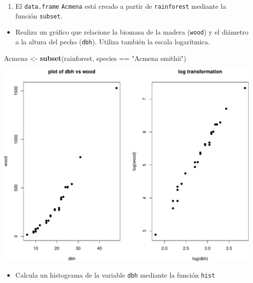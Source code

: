 \documentclass[]{article}
\def\tightlist{}
\newenvironment{Shaded}{\begin{snugshade}}{\end{snugshade}}
\newcommand{\KeywordTok}[1]{\textcolor[rgb]{0.13,0.29,0.53}{\textbf{{#1}}}}
\newcommand{\StringTok}[1]{\textcolor[rgb]{0.31,0.60,0.02}{{#1}}}
\newcommand{\NormalTok}[1]{{#1}}
\numberwithin{equation}{section}
\begin{document}
\begin{enumerate}
\def\labelenumi{\arabic{enumi}.}
\setcounter{enumi}{2}
\tightlist
\item
  El \texttt{data.frame} \texttt{Acmena} está creado a partir de
  \texttt{rainforest} mediante la función \texttt{subset}.
\end{enumerate}

\begin{itemize}
\tightlist
\item
  Realiza un gráfico que relacione la biomasa de la madera
  (\texttt{wood}) y el diámetro a la altura del pecho (\texttt{dbh}).
  Utiliza también la escala logarítmica.
\end{itemize}

\begin{Shaded}
\begin{Highlighting}[]
\NormalTok{Acmena <-}\StringTok{ }\KeywordTok{subset}\NormalTok{(rainforest, species ==}\StringTok{ "Acmena smithii"}\NormalTok{)}
\end{Highlighting}
\end{Shaded}

\includegraphics{tema1_files/figure-latex/unnamed-chunk-73-1.pdf}

\begin{itemize}
\tightlist
\item
  Calcula un histograma de la variable \texttt{dbh} mediante la función
  \texttt{hist}
\end{itemize}
\end{document}
